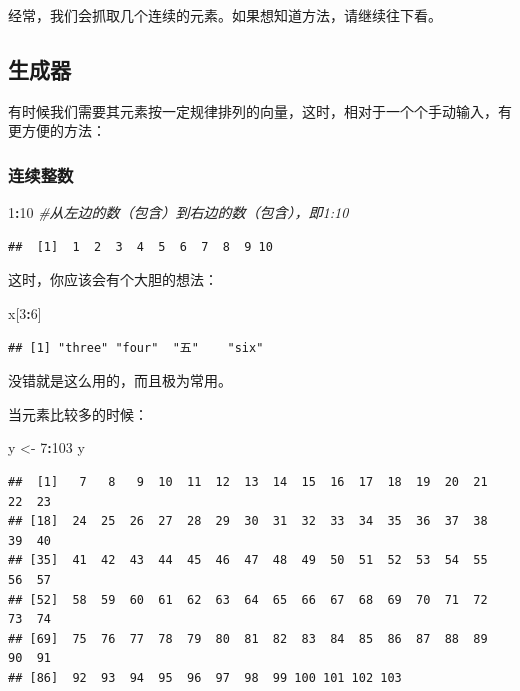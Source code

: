\documentclass[]{book}
\newenvironment{Shaded}{\begin{snugshade}}{\end{snugshade}}
\newcommand{\CommentTok}[1]{\textcolor[rgb]{0.56,0.35,0.01}{\textit{#1}}}
\newcommand{\DecValTok}[1]{\textcolor[rgb]{0.00,0.00,0.81}{#1}}
\newcommand{\NormalTok}[1]{#1}
\newcommand{\OperatorTok}[1]{\textcolor[rgb]{0.81,0.36,0.00}{\textbf{#1}}}
\newcommand{\StringTok}[1]{\textcolor[rgb]{0.31,0.60,0.02}{#1}}
\begin{document}
经常，我们会抓取几个连续的元素。如果想知道方法，请继续往下看。

\hypertarget{generator}{%
\subsection{生成器}\label{generator}}

有时候我们需要其元素按一定规律排列的向量，这时，相对于一个个手动输入，有更方便的方法：

\hypertarget{successive-int}{%
\subsubsection{连续整数}\label{successive-int}}

\begin{Shaded}
\begin{Highlighting}[]
\DecValTok{1}\OperatorTok{:}\DecValTok{10} \CommentTok{#从左边的数（包含）到右边的数（包含），即1:10}
\end{Highlighting}
\end{Shaded}

\begin{verbatim}
##  [1]  1  2  3  4  5  6  7  8  9 10
\end{verbatim}

这时，你应该会有个大胆的想法：

\begin{Shaded}
\begin{Highlighting}[]
\NormalTok{x[}\DecValTok{3}\OperatorTok{:}\DecValTok{6}\NormalTok{]}
\end{Highlighting}
\end{Shaded}

\begin{verbatim}
## [1] "three" "four"  "五"    "six"
\end{verbatim}

没错就是这么用的，而且极为常用。

当元素比较多的时候：

\begin{Shaded}
\begin{Highlighting}[]
\NormalTok{y <-}\StringTok{ }\DecValTok{7}\OperatorTok{:}\DecValTok{103}
\NormalTok{y}
\end{Highlighting}
\end{Shaded}

\begin{verbatim}
##  [1]   7   8   9  10  11  12  13  14  15  16  17  18  19  20  21  22  23
## [18]  24  25  26  27  28  29  30  31  32  33  34  35  36  37  38  39  40
## [35]  41  42  43  44  45  46  47  48  49  50  51  52  53  54  55  56  57
## [52]  58  59  60  61  62  63  64  65  66  67  68  69  70  71  72  73  74
## [69]  75  76  77  78  79  80  81  82  83  84  85  86  87  88  89  90  91
## [86]  92  93  94  95  96  97  98  99 100 101 102 103
\end{verbatim}
\end{document}
